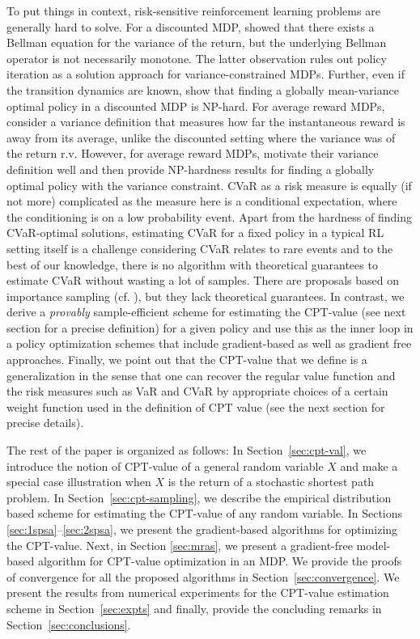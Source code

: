 \documentclass[11pt,letterpaper,english]{article}
\begin{document}
To put things in context, risk-sensitive reinforcement learning problems are generally hard to solve. 
For a discounted MDP, \cite{Sobel82VD} showed that there exists a Bellman equation for the variance of the return, but the underlying Bellman operator is not necessarily monotone. The latter observation rules out policy iteration as a solution approach for variance-constrained MDPs.
Further, even if the transition dynamics are known, \cite{mannor2013algorithmic} show that finding a globally mean-variance optimal policy in a discounted MDP is NP-hard.
For average reward MDPs, \cite{filar1989variance} consider a variance definition that measures how far the instantaneous reward is away from its average, unlike the discounted setting where the variance was of the return r.v. However, for average reward MDPs, \cite{filar1989variance} motivate their variance definition well and then provide NP-hardness results for finding a globally optimal policy with the variance constraint.
CVaR as a risk measure is equally (if not more) complicated as the measure here is a conditional expectation, where the conditioning is on a low probability event. Apart from the hardness of finding CVaR-optimal solutions, estimating CVaR for a fixed policy in a typical RL setting itself is a challenge considering CVaR relates to rare events and to the best of our knowledge, there is no algorithm with theoretical guarantees to estimate CVaR without wasting a lot of samples. There are proposals based on importance sampling (cf. \cite{prashanth2014policy,tamar2014optimizing}), but they lack theoretical guarantees. In contrast, we derive a \textit{provably} sample-efficient scheme for estimating the CPT-value (see next section for a precise definition) for a given policy and use this as the inner loop in a policy optimization schemes that include gradient-based as well as gradient free approaches. Finally, we point out that the CPT-value that we define is a generalization in the sense that one can recover the regular value function and the risk measures such as VaR and CVaR by appropriate choices of a certain weight function used in the definition of CPT value (see the next section for precise details).

The rest of the paper is organized as follows: 
In Section~\ref{sec:cpt-val}, we introduce the notion of CPT-value of a general random variable $X$ and make a special case illustration when $X$ is the return of a stochastic shortest path problem.
In Section~\ref{sec:cpt-sampling}, we
describe the empirical distribution based scheme for estimating the CPT-value of any random variable. In Sections \ref{sec:1spsa}--\ref{sec:2spsa}, we present the gradient-based algorithms for optimizing the CPT-value. Next, in Section \ref{sec:mras}, we present a gradient-free model-based algorithm for CPT-value optimization in an MDP. We provide the proofs of convergence for all the proposed algorithms in Section~\ref{sec:convergence}.
We present the results from numerical experiments for the CPT-value estimation scheme in Section~\ref{sec:expts} and finally, provide the concluding remarks in Section~\ref{sec:conclusions}.
\end{document}
